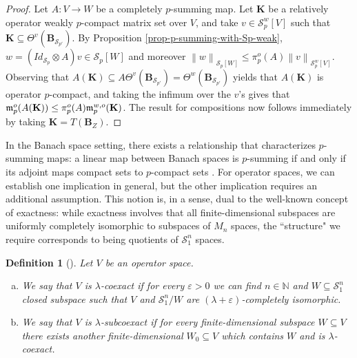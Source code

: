 \documentclass[11pt]{amsart}
\newcommand{\n}[1]{ \left\|#1\right\| }
\newcommand{\N}{{\mathbb{N}}}
\newtheorem{definition}[theorem]{Definition}
\numberwithin{equation}{section}
\begin{document}
\begin{proof}
Let $A : V \to W$ be a completely $p$-summing map.
Let $\mathbf{K}$ be a relatively operator weakly $p$-compact matrix set over $V$, and take $v \in \mathcal{S}_p^w[V]$ such that $\mathbf{K} \subseteq \Theta^v( \mathbf{B}_{\mathcal{S}_{p'}} )$.
By Proposition \ref{prop-p-summing-with-Sp-weak}, $w = (Id_{\mathcal{S}_p}\otimes A)v \in \mathcal{S}_p[W]$ and moreover $\n{w}_{\mathcal{S}_p[W]} \le \pi_p^o(A)\n{v}_{\mathcal{S}_p^w[V]}$.
Observing that $A(\mathbf{K}) \subseteq A\Theta^v(\mathbf{B}_{\mathcal{S}_{p'}}) = \Theta^w( \mathbf{B}_{\mathcal{S}_{p'}} )$ yields that $A(\mathbf{K})$ is operator $p$-compact, and taking the infimum over the $v$'s gives that $\frak m_p^o(A(\mathbf{K})) \le \pi_p^o(A) \frak m_p^{w,o}(\mathbf{K})$.
The result for compositions now follows immediately by taking $\mathbf{K} = T(\mathbf{B}_Z)$.
\end{proof}



In the Banach space setting, there exists a relationship that characterizes $p$-summing maps: a linear map between Banach spaces is $p$-summing if and only if its adjoint maps compact sets to $p$-compact sets \cite[Thm. 3.12]{Delgado-Pineiro-Serrano-adjoints}. For operator spaces, we can establish one implication in general, but the other implication requires an additional assumption. This notion is, in a sense, dual to the well-known concept of exactness: while exactness involves that all finite-dimensional subspaces are uniformly completely isomorphic to subspaces of $M_n$ spaces, the ``structure" we require corresponds to being quotients of $\mathcal{S}_1^n$ spaces. 

\begin{definition}[\cite{webster1998matrix}]
Let $V$ be an operator space.
\begin{enumerate}[(a)]
\item We say that $V$ is \emph{$\lambda$-coexact} if for every $\varepsilon>0$ we can find $n\in\N$ and $W \subseteq \mathcal{S}_1^n$ closed subspace such that $V$ and $\mathcal{S}_1^n/W$ are $(\lambda+\varepsilon)$-completely isomorphic.
\item We say that $V$ is \emph{$\lambda$-subcoexact} if for every finite-dimensional subspace $W \subseteq V$ there exists another finite-dimensional $W_0 \subseteq V$ which contains $W$ and is $\lambda$-coexact. 
\end{enumerate}    
\end{definition}
\end{document}
